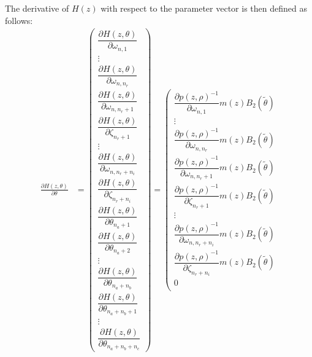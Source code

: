 \documentclass{article}
\begin{document}
\clearpage
The derivative of $H(z)$ with respect to the parameter vector is then defined as follows:
\begin{equation}
\begin{aligned}
\frac{\partial H(z,\theta)}{\partial \theta} &= 
\left(\begin{array}{c} 
\dfrac{\partial H(z,\theta)}{\partial \omega_{n,1}} \\
\vdots \\
\dfrac{\partial H(z,\theta)}{\partial \omega_{n,n_r}} \\
\dfrac{\partial H(z,\theta)}{\partial \omega_{n,n_r+1}} \\ \dfrac{\partial H(z,\theta)}{\partial \zeta_{n_r+1}} \\ \vdots \\ \dfrac{\partial H(z,\theta)}{\partial \omega_{n,n_r+n_i}} \\ \dfrac{\partial H(z,\theta)}{\partial \zeta_{n_r+n_i}} \\ \hline \dfrac{\partial H(z,\theta)}{\partial \theta_{n_a + 1}} \\ \dfrac{\partial H(z,\theta)}{\partial \theta_{n_a + 2}} \\ \vdots \\ \dfrac{\partial H(z,\theta)}{\partial \theta_{n_a + n_b }} \\ \hline \dfrac{\partial H(z,\theta)}{\partial \theta_{n_a + n_b + 1}} \\ \vdots \\ \dfrac{\partial H(z,\theta)}{\partial \theta_{n_a + n_b + n_c}} 
\end{array} \right)
= 
\left(\begin{array}{c} 
\dfrac{\partial p(z,\rho)^{-1}}{\partial \omega_{n,1}} m(z) B_2(\tilde{\theta}) \\ 
\vdots \\
\dfrac{\partial p(z,\rho)^{-1}}{\partial \omega_{n,n_r}} m(z) B_2(\tilde{\theta}) \\ 
\dfrac{\partial p(z,\rho)^{-1}}{\partial \omega_{n,n_r+1}} m(z) B_2(\tilde{\theta}) \\  
\dfrac{\partial p(z,\rho)^{-1}}{\partial \zeta_{n_r+1}} m(z) B_2(\tilde{\theta}) \\ 
\vdots \\ 
\dfrac{\partial p(z,\rho)^{-1}}{\partial \omega_{n,n_r+n_i}} m(z) B_2(\tilde{\theta}) \\  
\dfrac{\partial p(z,\rho)^{-1}}{\partial \zeta_{n_r+n_i}} m(z) B_2(\tilde{\theta}) \\  
\hline 0 \\ 

\end{array}
\end{aligned}
\end{equation}
\end{document}
